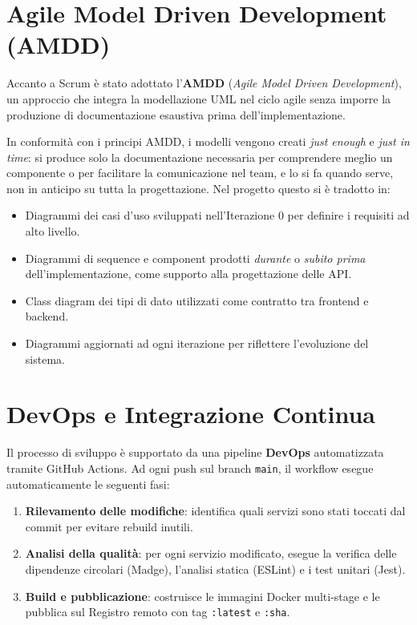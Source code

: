 \documentclass[12pt,a4paper,twoside]{report}
\begin{document}
\section{Agile Model Driven Development (AMDD)}

Accanto a Scrum è stato adottato l'\textbf{AMDD} (\textit{Agile Model Driven Development}), un approccio che integra la modellazione UML nel ciclo agile senza imporre la produzione di documentazione esaustiva prima dell'implementazione.

In conformità con i principi AMDD, i modelli vengono creati \textit{just enough} e \textit{just in time}: si produce solo la documentazione necessaria per comprendere meglio un componente o per facilitare la comunicazione nel team, e lo si fa quando serve, non in anticipo su tutta la progettazione. Nel progetto questo si è tradotto in:
\begin{itemize}
  \item Diagrammi dei casi d'uso sviluppati nell'Iterazione 0 per definire i requisiti ad alto livello.
  \item Diagrammi di sequence e component prodotti \textit{durante} o \textit{subito prima} dell'implementazione, come supporto alla progettazione delle API.
  \item Class diagram dei tipi di dato utilizzati come contratto tra frontend e backend.
  \item Diagrammi aggiornati ad ogni iterazione per riflettere l'evoluzione del sistema.
\end{itemize}

\section{DevOps e Integrazione Continua}

Il processo di sviluppo è supportato da una pipeline \textbf{DevOps} automatizzata tramite GitHub Actions. Ad ogni push sul branch \texttt{main}, il workflow esegue automaticamente le seguenti fasi:

\begin{enumerate}
  \item \textbf{Rilevamento delle modifiche}: identifica quali servizi sono stati toccati dal commit per evitare rebuild inutili.
  \item \textbf{Analisi della qualità}: per ogni servizio modificato, esegue la verifica delle dipendenze circolari (Madge), l'analisi statica (ESLint) e i test unitari (Jest).
  \item \textbf{Build e pubblicazione}: costruisce le immagini Docker multi-stage e le pubblica sul Registro remoto con tag \texttt{:latest} e \texttt{:sha}.
\end{enumerate}
\end{document}

